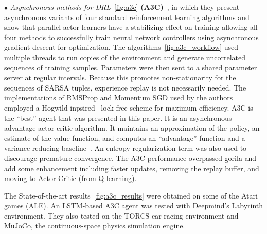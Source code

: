 $\bullet$ \textit{Asynchronous methods for DRL}~\ref{fig:a3c} \textbf{(A3C)}~\parencite{mnih2016asynchronous}, in which they present asynchronous variants of four standard reinforcement learning algorithms and show that parallel actor-learners have a stabilizing effect on training allowing all four methods to successfully train neural network controllers using asynchronous gradient descent for optimization. The algorithms~\ref{fig:a3c_workflow} used multiple threads to run copies of the environment and generate uncorrelated sequences of training samples. Parameters were then sent to a shared parameter server at regular intervals. Because this promotes non-stationarity for the sequences of SARSA tuples, experience replay is not necessarily needed. The implementations of RMSProp and Momentum SGD used by the authors employed a Hogwild-inpsired~\parencite{recht2011hogwild} lock-free scheme for maximum efficiency. A3C is the ``best'' agent that was presented in this paper. It is an asynchronous advantage actor-critic algorithm. It maintains an approximation of the policy, an estimate of the value function, and computes an ``advantage'' function and a variance-reducing baseline~\parencite{degris2012off}. An entropy regularization term was also used to discourage premature convergence. The A3C performance overpassed gorila and add some enhancement including faster updates, removing  the replay buffer, and moving to Actor-Critic (from Q learning).

The State-of-the-art results~\ref{fig:a3c_results} were obtained on some of the Atari games (ALE). An LSTM-based A3C agent was tested with Deepmind’s Labyrinth environment. They also tested on the TORCS car racing environment and MuJoCo, the continuous-space physics simulation engine.

